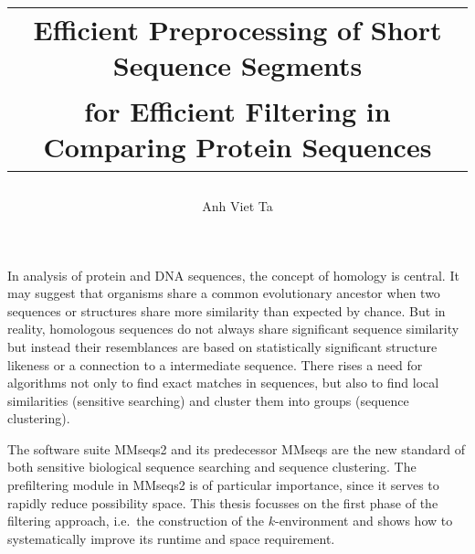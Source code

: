 \documentclass[twoside,a4paper,bsc]{master}
\begin{document}

\author{Anh Viet Ta}
\title{
       \begin{tabular}{c}
       \textbf{Efficient Preprocessing of Short Sequence Segments}\\[3mm]
       \textbf{for Efficient Filtering in Comparing Protein Sequences}
       \end{tabular}}
\Maketitle

\small
In analysis of protein and DNA sequences, the concept of homology is
central. It
may suggest that organisms share a common evolutionary ancestor when two
sequences or structures share more similarity than expected by chance. But
in
reality, homologous sequences do not always share significant sequence
similarity but instead their resemblances are based on statistically
significant
structure likeness or a connection to a intermediate sequence. There rises
a
need for algorithms not only to find exact matches in sequences, but also
to
find local similarities (sensitive searching) and cluster them into groups
(sequence clustering).

The software suite MMseqs2 and its predecessor MMseqs are the new standard
of both sensitive biological sequence searching and sequence clustering.
The prefiltering module in MMseqs2 is of particular importance, since it
serves to rapidly reduce possibility space. This thesis focusses on the
first phase of the filtering approach, i.e.\ the construction of the
\(k\)-environment and shows how to systematically improve its runtime and
space requirement.
\normalsize
\setcounter{tocdepth}{1}
\tableofcontents
\end{document}
